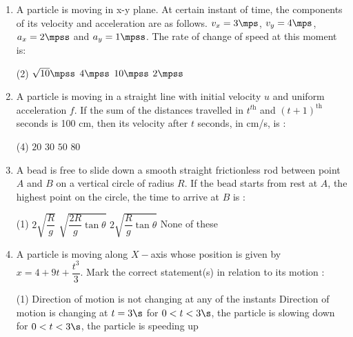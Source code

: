 \documentclass{article}
\newcommand{\itemstared}{\refstepcounter{enumi}\item[$^\star$\theenumi.]}
\renewcommand{\ans}{\quad}
\begin{document}
\begin{enumerate}
    \itemstared A particle is moving in x-y plane. At certain instant of time, the components of its velocity and acceleration are as follows. $v_x=3 \mps$, $v_y=4 \mps$, $a_x=2 \mpss$ and $a_y=1 \mpss$. The rate of change of speed at this moment is:
        \begin{tasks}(2)
        \task $\sqrt{10} \mpss$
        \task $4 \mpss$
        \task $10 \mpss$
        \task $2 \mpss$\ans
        \end{tasks}

    \item A particle is moving in a straight line with initial velocity $u$ and uniform acceleration $f$. If the sum of the distances travelled in $t^{\textit{th}}$ and $(t+1)^{\text{th}}$ seconds is 100 cm, then its velocity after $t$ seconds, in cm/s, is :
        \begin{tasks}(4)
            \task $20$
            \task $30$
            \task $50$\ans
            \task $80$
        \end{tasks}

        \item A bead is free to slide down a smooth straight frictionless rod between point $A$ and $B$ on a vertical circle of radius $R$. If the bead starts from rest at $A$, the highest point on the circle, the time to arrive at $B$ is : 
        \begin{multicols}{2}
        \begin{tasks}(1)
            \task $2\sqrt{\dfrac{R}{g}}$\ans
            \task $\sqrt{\dfrac{2R}{g}\tan \theta}$
            \task $2\sqrt{\dfrac{R}{g}\tan \theta}$
            \task None of these
        \end{tasks}
        \begin{center}
        \end{center}
        \end{multicols}

    \item A particle is moving along $X-$axis whose position is given by $x=4+9t + \dfrac{t^3}{3}$. Mark the correct statement(s) in relation to its motion :
        \begin{tasks}(1)
            \task Direction of motion is not changing at any of the instants\ans
            \task Direction of motion is changing at $t=3\s$
            \task for $0 < t < 3 \s$, the particle is slowing down
            \task for $0 < t <3 \s$, the particle is speeding up\ans
        \end{tasks}


\end{enumerate}
\end{document}
